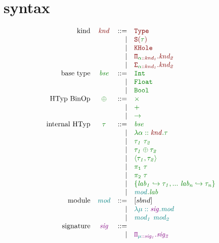 \documentclass[12pt,fleqn]{article}
\newcommand{\red}[1]{\textcolor{red}{#1}}
\newcommand{\green}[1]{\textcolor{green}{#1}}
\newcommand{\purple}[1]{\textcolor{purple}{#1}}
\newcommand{\teal}[1]{\textcolor{teal}{#1}}
\newcommand{\redtt}[1]{\red{\mathtt{#1}}}
\newcommand{\greentt}[1]{\green{\mathtt{#1}}}
\newcommand{\purplett}[1]{\purple{\mathtt{#1}}}
\newcommand{\tealtt}[1]{\teal{\mathtt{#1}}}
\newcommand{\redit}[1]{\red{\mathit{#1}}}
\newcommand{\greenit}[1]{\green{\mathit{#1}}}
\newcommand{\purpleit}[1]{\purple{\mathit{#1}}}
\newcommand{\tealit}[1]{\teal{\mathit{#1}}}
\newcommand{\knd}[1][]{\redit{knd#1}}
\newcommand{\typ}[1][]{\greenit{\tau#1}}
\newcommand{\typvar}[1][]{\greenit{\alpha#1}}
\newcommand{\modle}[1][]{\tealit{mod#1}}
\newcommand{\modlevar}[1][]{\tealit{\mu#1}}
\newcommand{\sig}[1][]{\purpleit{sig#1}}
\newcommand{\lab}[1][]{\mathit{lab#1}}
\begin{document}
\section{syntax}
\[\begin{array}{rcrl}
    \mathrm{kind} & \knd & ::=
                  & \redtt{Type} \\
                  && \vert & \redtt{S(\typ)} \\
                  && \vert & \redtt{KHole} \\
                  && \vert & \redtt{\Pi_{\typvar::\knd[_1]}.\knd[_2]} \\
                  && \vert & \redtt{\Sigma_{\typvar::\knd[_1]}.\knd[_2]} \\
    \mathrm{base~type} & \greenit{bse} & ::=
                       & \greentt{Int} \\
                       && \vert & \greentt{Float} \\
                       && \vert & \greentt{Bool} \\
    \mathrm{HTyp~BinOp} & \greenit{\oplus} & ::=
                   & \greentt{\times} \\
                   && \vert & \greentt{+} \\
                   && \vert & \greentt{\rightarrow}\\
    \mathrm{internal~HTyp} & \typ & ::=
                           & \greenit{bse} \\
                           && \vert & \greentt{\lambda\typvar::\knd.\typ} \\
                           && \vert & \greentt{\typ[_1]~\typ[_2]} \\
                           && \vert & \greentt{\typ[_1] \oplus \typ[_2]} \\
                           && \vert & \greentt{\langle\typ[_1], \typ[_2]\rangle} \\
                           && \vert & \greentt{\pi_1~\typ} \\
                           && \vert & \greentt{\pi_2~\typ} \\
                           && \vert & \greentt{\{\lab[_1] \hookrightarrow \typ[_1], ...~\lab[_n] \hookrightarrow \typ[_n]\}} \\
                           && \vert & \greentt{\modle.\lab} \\
    \mathrm{module} & \modle & ::=
                    & [sbnd] \\
                    && \vert & \tealtt{\lambda\modlevar::\sig.\modle} \\
                    && \vert & \tealtt{\modle[_1]~\modle[_2]} \\
    \mathrm{signature} & \sig & ::=
                       & \\
                       && \vert & \purplett{\Pi_{\modlevar::\sig[_1]}.\sig[_2]} \\
\end{array}\]
\end{document}
